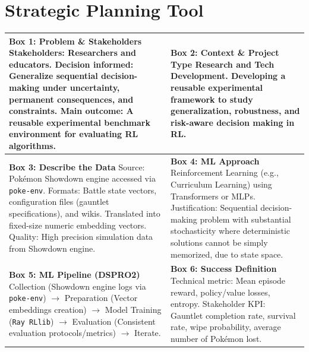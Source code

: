 \documentclass[11pt, a4paper]{article}
\begin{document}
\section*{Strategic Planning Tool}
\begin{table}[h!]
    \centering
    \small
    \begin{tabularx}{\textwidth}{|X|X|}
        \hline
        \textbf{Box 1: Problem \& Stakeholders} \newline 
        Stakeholders: Researchers and educators. Decision informed: Generalize sequential decision-making under uncertainty, permanent consequences, and constraints. Main outcome: A reusable experimental benchmark environment for evaluating RL algorithms. & 
        \textbf{Box 2: Context \& Project Type} \newline 
        Research and Tech Development. Developing a reusable experimental framework to study generalization, robustness, and risk-aware decision making in RL. \\ \hline
        
        \textbf{Box 3: Describe the Data} \newline 
        Source: Pokémon Showdown engine accessed via \texttt{poke-env}. Formats: Battle state vectors, configuration files (gauntlet specifications), and wikis. Translated into fixed-size numeric embedding vectors. Quality: High precision simulation data from Showdown engine. & 
        \textbf{Box 4: ML Approach} \newline 
        Reinforcement Learning (e.g., Curriculum Learning) using Transformers or MLPs. Justification: Sequential decision-making problem with substantial stochasticity where deterministic solutions cannot be simply memorized, due to state space.\\ \hline
        
        \textbf{Box 5: ML Pipeline (DSPRO2)} \newline 
        Collection (Showdown engine logs via \texttt{poke-env}) $\rightarrow$ Preparation (Vector embeddings creation) $\rightarrow$ Model Training (\texttt{Ray RLlib}) $\rightarrow$ Evaluation (Consistent evaluation protocols/metrics) $\rightarrow$ Iterate. & 
        \textbf{Box 6: Success Definition} \newline 
        Technical metric: Mean episode reward, policy/value losses, entropy. \newline Stakeholder KPI: Gauntlet completion rate, survival rate, wipe probability, average number of Pokémon lost. \\ \hline
        

\end{tabularx}
\end{table}
\end{document}
